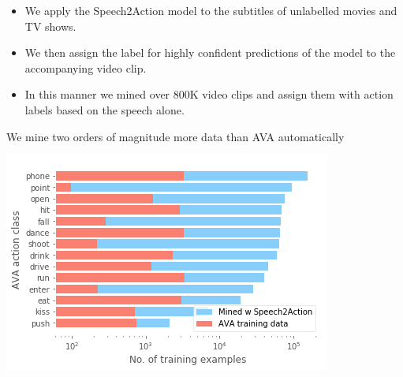 \documentclass[landscape,a0paper,fontscale=0.292]{baposter}
\begin{document}
\begin{poster}
{    \begin{minipage}{0.75\linewidth}
        \begin{center}
        \begin{itemize}
            \item We apply the Speech2Action model to the subtitles of unlabelled movies and TV shows. 
            \item We then assign the label for highly confident predictions of the model to the accompanying video clip. 
            \item In this manner we mined over 800K video clips and assign them with action labels based on the speech alone. 
        \end{itemize}
        \end{center}
    \end{minipage}
    \begin{minipage}{0.2\linewidth}
        \begin{center}
            \begin{tiny}We mine two orders of magnitude more data than AVA automatically
            \end{tiny}
     \includegraphics[width=1\linewidth]{images/training_dist.png}
        \end{center}
    \end{minipage}


}
\end{poster}
\end{document}
